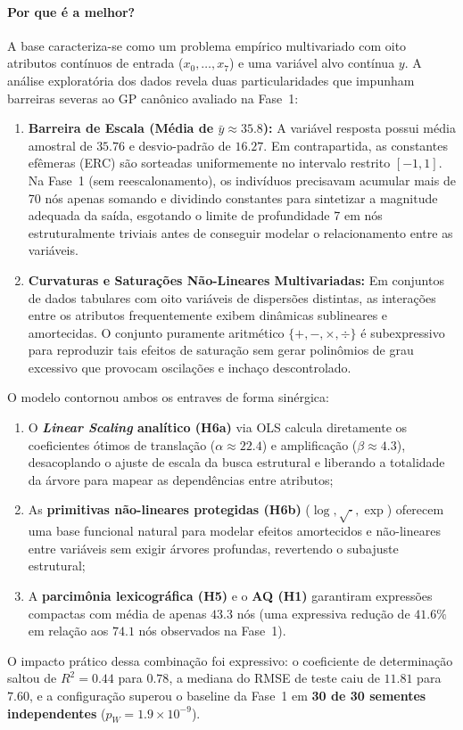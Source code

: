 \paragraph{Por que é a melhor?}
A base  caracteriza-se como um problema empírico multivariado com
oito atributos contínuos de entrada ($x_0,\dots,x_7$) e uma variável alvo contínua $y$.
A análise exploratória dos dados revela duas particularidades que
impunham barreiras severas ao GP canônico avaliado na Fase~1:
\begin{enumerate}
  \item \textbf{Barreira de Escala (Média de $\bar{y} \approx 35.8$):} A variável resposta
        possui média amostral de $35.76$ e desvio-padrão de $16.27$. Em contrapartida,
        as constantes efêmeras (ERC) são sorteadas uniformemente no intervalo restrito
        $[-1, 1]$. Na Fase~1 (sem reescalonamento), os indivíduos precisavam acumular mais
        de 70 nós apenas somando e dividindo constantes para sintetizar a magnitude
        adequada da saída, esgotando o limite de profundidade 7 em nós estruturalmente
        triviais antes de conseguir modelar o relacionamento entre as variáveis.
  \item \textbf{Curvaturas e Saturações Não-Lineares Multivariadas:} Em conjuntos de
        dados tabulares com oito variáveis de dispersões distintas, as interações entre os
        atributos frequentemente exibem dinâmicas sublineares e amortecidas. O conjunto
        puramente aritmético $\{+,-,\times,\div\}$ é subexpressivo para reproduzir tais
        efeitos de saturação sem gerar polinômios de grau excessivo que provocam oscilações
        e inchaço descontrolado.
\end{enumerate}

O modelo  contornou ambos os entraves de forma sinérgica:
\begin{enumerate}[label=(\roman*)]
  \item O \textbf{\emph{Linear Scaling} analítico (H6a)} via OLS calcula
        diretamente os coeficientes ótimos de translação ($\alpha \approx 22.4$) e
        amplificação ($\beta \approx 4.3$), desacoplando o ajuste de escala da busca
        estrutural e liberando a totalidade da árvore para mapear as dependências
        entre atributos;
  \item As \textbf{primitivas não-lineares protegidas (H6b)} ($\log, \sqrt{\cdot}, \exp$)
        oferecem uma base funcional natural para modelar efeitos amortecidos e
        não-lineares entre variáveis sem exigir árvores profundas, revertendo o
        subajuste estrutural;
  \item A \textbf{parcimônia lexicográfica (H5)} e o \textbf{AQ (H1)} garantiram
        expressões compactas com média de apenas $43.3$ nós (uma expressiva
        redução de $41.6\%$ em relação aos $74.1$ nós observados na Fase~1).
\end{enumerate}
O impacto prático dessa combinação foi expressivo: o coeficiente de determinação
saltou de $R^2 = 0.44$ para $\mathbf{0.78}$, a mediana do RMSE de teste caiu de
$11.81$ para $\mathbf{7.60}$, e a configuração superou o baseline da Fase~1 em
\textbf{30 de 30 sementes independentes} ($p_W = 1.9 \times 10^{-9}$).

